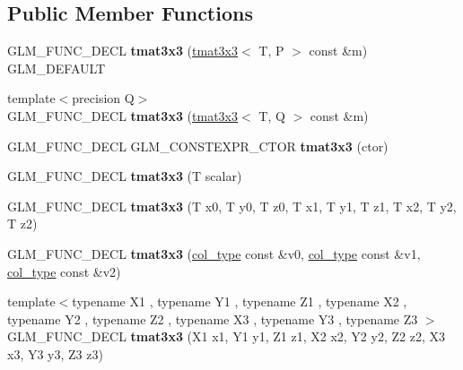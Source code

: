\subsection*{Public Member Functions}
\begin{DoxyCompactItemize}
\item 
\mbox{\label{structglm_1_1tmat3x3_a0b809e3ca9e9a52ee512517df570a6d8}} 
G\+L\+M\+\_\+\+F\+U\+N\+C\+\_\+\+D\+E\+CL {\bfseries tmat3x3} (\hyperlink{structglm_1_1tmat3x3}{tmat3x3}$<$ T, P $>$ const \&m) G\+L\+M\+\_\+\+D\+E\+F\+A\+U\+LT
\item 
\mbox{\label{structglm_1_1tmat3x3_a8b70a7497b9dc3aba4c12a7fa847b265}} 
{\footnotesize template$<$precision Q$>$ }\\G\+L\+M\+\_\+\+F\+U\+N\+C\+\_\+\+D\+E\+CL {\bfseries tmat3x3} (\hyperlink{structglm_1_1tmat3x3}{tmat3x3}$<$ T, Q $>$ const \&m)
\item 
\mbox{\label{structglm_1_1tmat3x3_a6b5ffa0701600e08a8d73a2d9990b2d4}} 
G\+L\+M\+\_\+\+F\+U\+N\+C\+\_\+\+D\+E\+CL G\+L\+M\+\_\+\+C\+O\+N\+S\+T\+E\+X\+P\+R\+\_\+\+C\+T\+OR {\bfseries tmat3x3} (ctor)
\item 
\mbox{\label{structglm_1_1tmat3x3_a7d19c7dd303ec176f88c5745a51feb62}} 
G\+L\+M\+\_\+\+F\+U\+N\+C\+\_\+\+D\+E\+CL {\bfseries tmat3x3} (T scalar)
\item 
\mbox{\label{structglm_1_1tmat3x3_abc56922cf0d112425311fbf6ea21928b}} 
G\+L\+M\+\_\+\+F\+U\+N\+C\+\_\+\+D\+E\+CL {\bfseries tmat3x3} (T x0, T y0, T z0, T x1, T y1, T z1, T x2, T y2, T z2)
\item 
\mbox{\label{structglm_1_1tmat3x3_a600f68b1c8033fa18fb64fc3dfd5b6eb}} 
G\+L\+M\+\_\+\+F\+U\+N\+C\+\_\+\+D\+E\+CL {\bfseries tmat3x3} (\hyperlink{structglm_1_1tvec3}{col\+\_\+type} const \&v0, \hyperlink{structglm_1_1tvec3}{col\+\_\+type} const \&v1, \hyperlink{structglm_1_1tvec3}{col\+\_\+type} const \&v2)
\item 
\mbox{\label{structglm_1_1tmat3x3_a02ca559b77e60d87c9511b1da01181c9}} 
{\footnotesize template$<$typename X1 , typename Y1 , typename Z1 , typename X2 , typename Y2 , typename Z2 , typename X3 , typename Y3 , typename Z3 $>$ }\\G\+L\+M\+\_\+\+F\+U\+N\+C\+\_\+\+D\+E\+CL {\bfseries tmat3x3} (X1 x1, Y1 y1, Z1 z1, X2 x2, Y2 y2, Z2 z2, X3 x3, Y3 y3, Z3 z3)

\end{DoxyCompactItemize}
